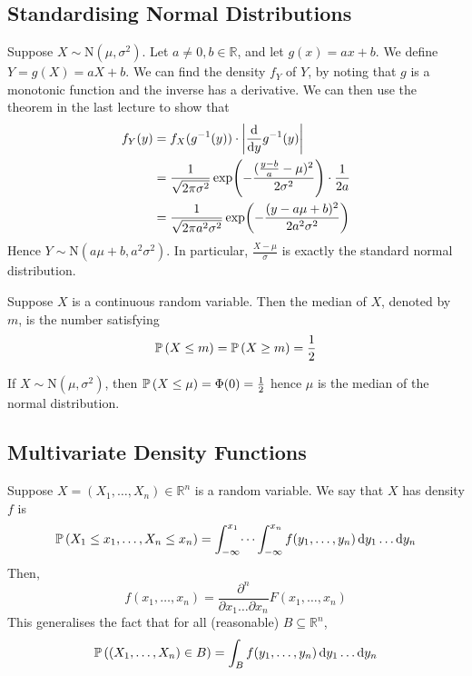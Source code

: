 \subsection{Standardising Normal Distributions}
Suppose $X \sim \mathrm{N}(\mu, \sigma^2)$. Let $a \neq 0, b \in \mathbb R$, and let $g(x) = ax+b$. We define $Y = g(X) = aX+b$. We can find the density $f_Y$ of $Y$, by noting that $g$ is a monotonic function and the inverse has a derivative. We can then use the theorem in the last lecture to show that
\begin{align*}
	f_Y(y) & = f_X(g^{-1}(y)) \cdot \abs{\dv{y} g^{-1}(y)}                                                       \\
	       & = \frac{1}{\sqrt{2\pi\sigma^2}} \exp(-\frac{(\frac{y-b}{a} - \mu)^2}{2\sigma^2}) \cdot \frac{1}{2a} \\
	       & =\frac{1}{\sqrt{2\pi a^2\sigma^2}} \exp(-\frac{(y - a\mu + b)^2}{2 a^2 \sigma^2})
\end{align*}
Hence $Y \sim \mathrm{N}(a \mu + b, a^2 \sigma^2)$. In particular, $\frac{X-\mu}{\sigma}$ is exactly the standard normal distribution.
\begin{definition}
	Suppose $X$ is a continuous random variable. Then the median of $X$, denoted by $m$, is the number satisfying
	\[ \mathbb{P}\left({X \leq m}\right) = \mathbb{P}\left({X \geq m}\right) = \frac{1}{2} \]
\end{definition}
\noindent If $X \sim \mathrm{N}(\mu, \sigma^2)$, then $\mathbb{P}\left({X \leq \mu}\right) = \Phi(0) = \frac{1}{2}$ hence $\mu$ is the median of the normal distribution.

\subsection{Multivariate Density Functions}
Suppose $X = (X_1, \dots, X_n) \in \mathbb R^n$ is a random variable. We say that $X$ has density $f$ is
\[ \mathbb{P}\left({X_1 \leq x_1, \dots, X_n \leq x_n}\right) = \int_{-\infty}^{x_1} \dots \int_{-\infty}^{x_n}  f(y_1, \dots, y_n) \dd{y_1} \dots \dd{y_n} \]
Then,
\[ f(x_1, \dots, x_n) = \frac{\partial^n}{\partial x_1 \dots \partial x_n} F(x_1, \dots, x_n) \]
This generalises the fact that for all (reasonable) $B \subseteq \mathbb R^n$,
\[ \mathbb{P}\left({(X_1, \dots, X_n) \in B}\right) = \int_B f(y_1, \dots, y_n) \dd{y_1}\dots\dd{y_n} \]

